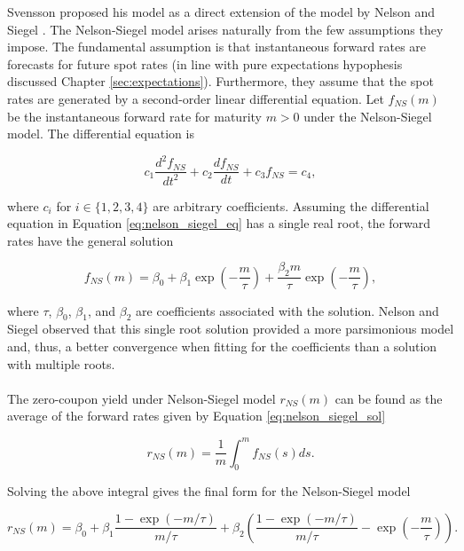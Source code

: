 \documentclass[a4paper]{artikel3}
\numberwithin{equation}{section}
\numberwithin{theorem}{section}
\numberwithin{proposition}{section}
\numberwithin{lemma}{section}
\begin{document}
Svensson \cite{svensson_1994} proposed his model as a direct extension of the model by Nelson and Siegel \cite{nelson_siegel_1987}. The Nelson-Siegel model arises naturally from the few assumptions they impose. The fundamental assumption is that instantaneous forward rates are forecasts for future spot rates (in line with pure expectations hypophesis discussed Chapter \ref{sec:expectations}). Furthermore, they assume that the spot rates are generated by a second-order linear differential equation. Let $f_{NS}(m)$ be the instantaneous forward rate for maturity $m > 0$ under the Nelson-Siegel model. The differential equation is 

\begin{equation}
    \label{eq:nelson_siegel_eq}
    c_1 \frac{d^2 f_{NS}}{dt^2} + c_2\frac{df_{NS}}{dt} + c_3f_{NS} = c_4 ,
\end{equation}

where $c_i$ for $i \in \{1, 2, 3, 4\}$ are arbitrary coefficients. Assuming the differential equation in Equation \eqref{eq:nelson_siegel_eq} has a single real root, the forward rates have the general solution 

\begin{equation}
    \label{eq:nelson_siegel_sol}
    f_{NS}(m) = \beta_0 + \beta_1 \exp \left( -\frac{m}{\tau} \right) + \frac{\beta_2m}{\tau} \exp \left( -\frac{m}{\tau} \right) ,
\end{equation}

where $\tau$, $\beta_0$, $\beta_1$, and $\beta_2$ are coefficients associated with the solution. Nelson and Siegel observed that this single root solution provided a more parsimonious model and, thus, a better convergence when fitting for the coefficients than a solution with multiple roots. \\
\\
The zero-coupon yield under Nelson-Siegel model $r_{NS}(m)$ can be found as the average of the forward rates given by Equation \eqref{eq:nelson_siegel_sol}

\begin{equation*}
    r_{NS}(m) = \frac{1}{m}\int_0^m f_{NS}(s) ds .
\end{equation*}

Solving the above integral gives the final form for the Nelson-Siegel model

\begin{equation*}
    r_{NS}(m) = \beta_0 + \beta_1 \frac{1 - \exp \left( -m / \tau \right)}{m / \tau} + \beta_2 \left( \frac{1 - \exp \left( -m / \tau \right)}{m / \tau} - \exp \left( -\frac{m}{\tau} \right) \right) .
\end{equation*}
\end{document}
